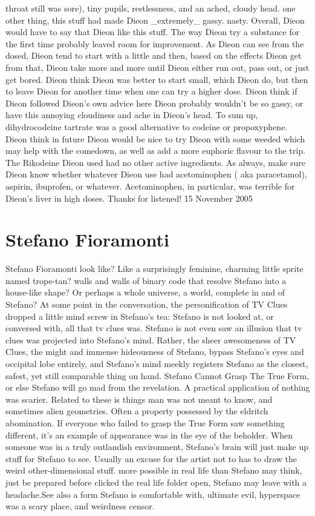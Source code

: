 \documentclass[12pt]{book}
\begin{document}
throat still was sore), tiny pupils, restlessness, and an ached, cloudy head. one other thing, this stuff had made Dieon \_extremely\_ gassy. nasty. Overall, Dieon would have to say that Dieon like this stuff. The way Dieon try a substance for the first time probably leaved room for improvement. As Dieon can see from the dosed, Dieon tend to start with a little and then, based on the effects Dieon get from that, Dieon take more and more until Dieon either run out, pass out, or just get bored. Dieon think Dieon was better to start small, which Dieon do, but then to leave Dieon for another time when one can try a higher dose. Dieon think if Dieon followed Dieon's own advice here Dieon probably wouldn't be so gassy, or have this annoying cloudiness and ache in Dieon's head. To sum up, dihydrocodeine tartrate was a good alternative to codeine or propoxyphene. Dieon think in future Dieon would be nice to try Dieon with some weeded which may help with the comedown, as well as add a more euphoric flavour to the trip. The Rikodeine Dieon used had no other active ingredients. As always, make sure Dieon know whether whatever Dieon use had acetominophen ( aka paracetamol), aspirin, ibuprofen, or whatever. Acetominophen, in particular, was terrible for Dieon's liver in high doses. Thanks for listened! 15 November 2005



\chapter{Stefano Fioramonti}

Stefano Fioramonti look like? Like a surprisingly feminine, charming little sprite named trope-tan? walls and walls of binary code that resolve Stefano into a house-like shape? Or perhaps a whole universe, a world, complete in and of Stefano? At some point in the conversation, the personification of TV Clues dropped a little mind screw in Stefano's tea: Stefano is not looked at, or conversed with, all that tv clues was. Stefano is not even saw an illusion that tv clues was projected into Stefano's mind. Rather, the sheer awesomeness of TV Clues, the might and immense hideousness of Stefano, bypass Stefano's eyes and occipital lobe entirely, and Stefano's mind meekly registers Stefano as the closest, safest, yet still comparable thing on hand. Stefano Cannot Grasp The True Form, or else Stefano will go mad from the revelation. A practical application of nothing was scarier. Related to these is things man was not meant to know, and sometimes alien geometries. Often a property possessed by the eldritch abomination. If everyone who failed to grasp the True Form saw something different, it's an example of appearance was in the eye of the beholder. When someone was in a truly outlandish environment, Stefano's brain will just make up stuff for Stefano to see. Usually an excuse for the artist not to has to draw the weird other-dimensional stuff. more possible in real life than Stefano may think, just be prepared before clicked the real life folder open, Stefano may leave with a headache.See also a form Stefano is comfortable with, ultimate evil, hyperspace was a scary place, and weirdness censor.
\end{document}
